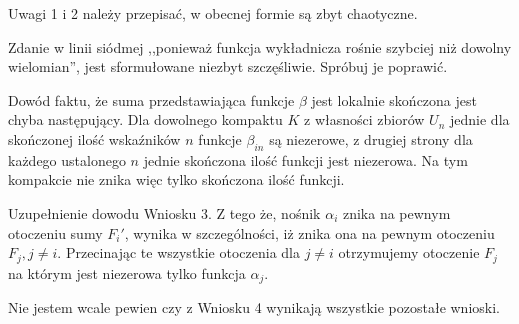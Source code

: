 \documentclass[a4paper,11pt]{article}
\begin{document}
\vspace{\spaceFour}


\start {} Uwagi 1 i 2 należy przepisać, w obecnej formie są
zbyt chaotyczne.

\vspace{\spaceFour}


\start {} Zdanie w linii siódmej ,,ponieważ funkcja wykładnicza
rośnie szybciej niż dowolny wielomian'', jest sformułowane niezbyt
szczęśliwie. Spróbuj je poprawić.

\vspace{\spaceFour}


\start {} Dowód faktu, że suma przedstawiająca funkcje $\beta$
jest lokalnie skończona jest chyba następujący. Dla dowolnego kompaktu
$K$ z własności zbiorów $U_{ n }$ jednie dla skończonej ilość
wskaźników $n$ funkcje $\beta_{ i n }$ są niezerowe, z drugiej strony
dla każdego ustalonego $n$ jednie skończona ilość funkcji jest
niezerowa. Na tym kompakcie nie znika więc tylko skończona ilość
funkcji.

\vspace{\spaceFour}


\start {} Uzupełnienie dowodu Wniosku 3. Z tego że, nośnik
$\alpha_{ i }$ znika na pewnym otoczeniu sumy $F_{ i }'$, wynika w
szczególności, iż znika ona na pewnym otoczeniu $F_{ j }, j \neq i$.
Przecinając te wszystkie otoczenia dla $j \neq i$ otrzymujemy
otoczenie $F_{ j }$ na którym jest niezerowa tylko funkcja
$\alpha_{ j }$.

\vspace{\spaceFour}


\start {} Nie jestem wcale pewien czy z Wniosku 4 wynikają
wszystkie pozostałe wnioski.

\vspace{\spaceFour}
\end{document}
